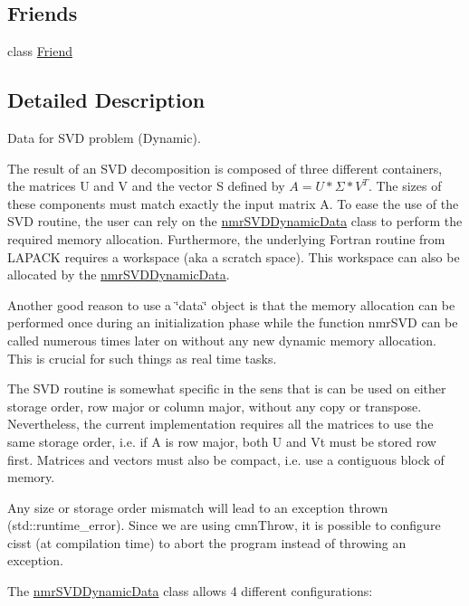 \subsection*{Friends}
\begin{DoxyCompactItemize}
\item 
class \hyperlink{classnmr_s_v_d_dynamic_data_a7f8321d57e81bc613d5dbef3410ba70e}{Friend}
\end{DoxyCompactItemize}


\subsection{Detailed Description}
Data for S\-V\-D problem (Dynamic). 

The result of an S\-V\-D decomposition is composed of three different containers, the matrices U and V and the vector S defined by $ A = U * \Sigma * V^{T} $. The sizes of these components must match exactly the input matrix A. To ease the use of the S\-V\-D routine, the user can rely on the \hyperlink{classnmr_s_v_d_dynamic_data}{nmr\-S\-V\-D\-Dynamic\-Data} class to perform the required memory allocation. Furthermore, the underlying Fortran routine from L\-A\-P\-A\-C\-K requires a workspace (aka a scratch space). This workspace can also be allocated by the \hyperlink{classnmr_s_v_d_dynamic_data}{nmr\-S\-V\-D\-Dynamic\-Data}.

Another good reason to use a \char`\"{}data\char`\"{} object is that the memory allocation can be performed once during an initialization phase while the function nmr\-S\-V\-D can be called numerous times later on without any new dynamic memory allocation. This is crucial for such things as real time tasks.

The S\-V\-D routine is somewhat specific in the sens that is can be used on either storage order, row major or column major, without any copy or transpose. Nevertheless, the current implementation requires all the matrices to use the same storage order, i.\-e. if A is row major, both U and Vt must be stored row first. Matrices and vectors must also be compact, i.\-e. use a contiguous block of memory.

Any size or storage order mismatch will lead to an exception thrown (std\-::runtime\-\_\-error). Since we are using cmn\-Throw, it is possible to configure cisst (at compilation time) to abort the program instead of throwing an exception.

The \hyperlink{classnmr_s_v_d_dynamic_data}{nmr\-S\-V\-D\-Dynamic\-Data} class allows 4 different configurations\-:


